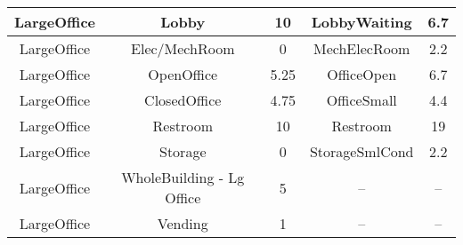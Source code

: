 \begin{table}
\begin{tabular}{|c|c|c|c|c|}
LargeOffice            & Lobby                        & 10                                                                                                            & LobbyWaiting                      & 6.7                                                                                                            \\ \hline
LargeOffice            & Elec/MechRoom                & 0                                                                                                             & MechElecRoom                      & 2.2                                                                                                            \\ \hline
LargeOffice            & OpenOffice                   & 5.25                                                                                                          & OfficeOpen                        & 6.7                                                                                                            \\ \hline
LargeOffice            & ClosedOffice                 & 4.75                                                                                                          & OfficeSmall                       & 4.4                                                                                                            \\ \hline
LargeOffice            & Restroom                     & 10                                                                                                            & Restroom                          & 19                                                                                                             \\ \hline
LargeOffice            & Storage                      & 0                                                                                                             & StorageSmlCond                    & 2.2                                                                                                            \\ \hline
LargeOffice            & WholeBuilding - Lg Office    & 5                                                                                                             & --                                & --                                                                                                             \\ \hline
LargeOffice            & Vending                      & 1                                                                                                             & --                                & --                                                                                                             \\ \hline

\end{tabular}
\end{table}

